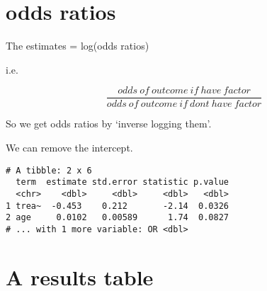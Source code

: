 \documentclass[]{tufte-handout}
\newenvironment{Shaded}{}{}
\newcommand{\DataTypeTok}[1]{\textcolor[rgb]{0.56,0.13,0.00}{#1}}
\newcommand{\KeywordTok}[1]{\textcolor[rgb]{0.00,0.44,0.13}{\textbf{#1}}}
\newcommand{\NormalTok}[1]{#1}
\newcommand{\OperatorTok}[1]{\textcolor[rgb]{0.40,0.40,0.40}{#1}}
\newcommand{\StringTok}[1]{\textcolor[rgb]{0.25,0.44,0.63}{#1}}
\begin{document}
\hypertarget{odds-ratios}{%
\section{odds ratios}\label{odds-ratios}}

The estimates = log(odds ratios)

i.e.

\[\frac{odds\ of\ outcome\ if\ have\ factor}{odds\ of\ outcome\ if\ dont\ have\ factor}\]

So we get odds ratios by `inverse logging them'.

We can remove the intercept.

\begin{Shaded}
\end{Shaded}

\begin{verbatim}
# A tibble: 2 x 6
  term  estimate std.error statistic p.value
  <chr>    <dbl>     <dbl>     <dbl>   <dbl>
1 trea~  -0.453    0.212       -2.14  0.0326
2 age     0.0102   0.00589      1.74  0.0827
# ... with 1 more variable: OR <dbl>
\end{verbatim}

\hypertarget{a-results-table}{%
\section{A results table}\label{a-results-table}}

\begin{Shaded}
\end{Shaded}
\end{document}

